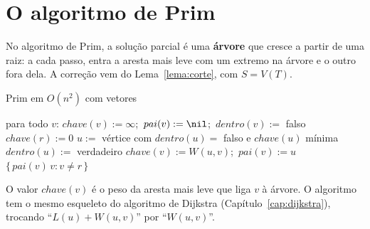 \section{O algoritmo de Prim}\label{sec:prim}
No algoritmo de Prim, a solução parcial é uma \textbf{árvore} que cresce a partir de uma raiz: a cada passo, entra a aresta mais leve com um extremo na árvore e o outro fora dela. A correção vem do Lema~\ref{lema:corte}, com $S=V(T)$.
\begin{pseudo}{Prim em $O(n^2)$ com vetores}
\begin{algorithmic}
  \State para todo $v$: $chave(v):=\infty$;\ $pai(v):=\nil$;\ $dentro(v):=$ falso
  \State $chave(r):=0$
    \State $u:=$ vértice com $dentro(u)=$ falso e $chave(u)$ mínima 
    \State $dentro(u):=$ verdadeiro 
     
       \State $chave(v):=W(u,v)$;\ $pai(v):=u$ \EndIf
    \EndFor
  \EndFor
  \State \Return $\{\,pai(v)\,v : v\ne r\,\}$
\EndFunction
\end{algorithmic}
\end{pseudo}
O valor $chave(v)$ é o peso da aresta mais leve que liga $v$ à árvore. O algoritmo tem o mesmo esqueleto do algoritmo de Dijkstra (Capítulo~\ref{cap:dijkstra}), trocando ``$L(u)+W(u,v)$'' por ``$W(u,v)$''.

